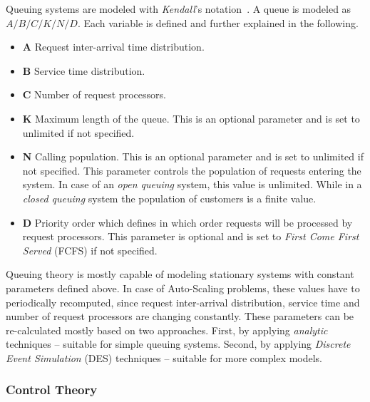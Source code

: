 Queuing systems are modeled with \emph{Kendall}'s notation~\cite{kendall1953}. A queue is modeled as $A/B/C/K/N/D$. Each variable is defined and further explained in the following.
\begin{itemize}
    \item \textbf{A} Request inter-arrival time distribution.
    \item \textbf{B} Service time distribution.
    \item \textbf{C} Number of request processors.
    \item \textbf{K} Maximum length of the queue. This is an optional parameter and is set to unlimited if not specified.
    \item \textbf{N} Calling population. This is an optional parameter and is set to unlimited if not specified. This parameter controls the population of requests entering the system. In case of an \emph{open queuing} system, this value is unlimited. While in a \emph{closed queuing} system the population of customers is a finite value.
    \item \textbf{D} Priority order which defines in which order requests will be processed by request processors. This parameter is optional and is set to \emph{First Come First Served} (FCFS) if not specified.
\end{itemize}

Queuing theory is mostly capable of modeling stationary systems with constant parameters defined above. In case of Auto-Scaling problems, these values have to periodically recomputed, since request inter-arrival distribution, service time and number of request processors are changing constantly. These parameters can be re-calculated mostly based on two approaches. First, by applying \emph{analytic} techniques -- suitable for simple queuing systems. Second, by applying \emph{Discrete Event Simulation} (DES) techniques -- suitable for more complex models.

\subsubsection{Control Theory}


